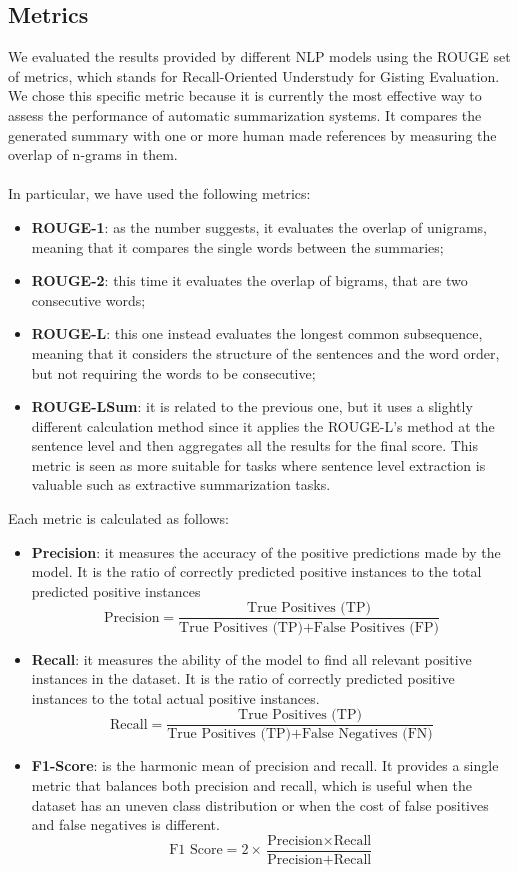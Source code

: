 \documentclass[10pt,twocolumn,letterpaper]{article}
\begin{document}
\subsection{Metrics}
We evaluated the results provided by different NLP models using the ROUGE set of metrics, which stands for Recall-Oriented Understudy for Gisting Evaluation. We chose this specific metric because it is currently the most effective way to assess the performance of automatic summarization systems. It compares the generated summary with one or more human made references by measuring the overlap of n-grams in them. \\ \\ 
In particular, we have used the following metrics:
\begin{itemize}
    \item \textbf{ROUGE-1}: as the number suggests, it evaluates the overlap of unigrams, meaning that it compares the single words between the summaries;
    \item \textbf{ROUGE-2}: this time it evaluates the overlap of bigrams, that are two consecutive words;
    \item \textbf{ROUGE-L}: this one instead evaluates the longest common subsequence, meaning that it considers the structure of the sentences and the word order, but not requiring the words to be consecutive;
    \item \textbf{ROUGE-LSum}: it is related to the previous one, but it uses a slightly different calculation method since it applies the ROUGE-L's method at the sentence level and then aggregates all the results for the final score. This metric is seen as more suitable for tasks where sentence level extraction is valuable such as extractive summarization tasks.
\end{itemize}
Each metric is calculated as follows:
\begin{itemize}
    \item \textbf{Precision}: it measures the accuracy of the positive predictions made by the model. It is the ratio of correctly predicted positive instances to the total predicted positive instances \\
    \[ \text{Precision} = \frac{\text{True Positives (TP)}}{\text{True Positives (TP)} + \text{False Positives (FP)}} \]
    \item \textbf{Recall}: it measures the ability of the model to find all relevant positive instances in the dataset. It is the ratio of correctly predicted positive instances to the total actual positive instances. \\
    \[ \text{Recall} = \frac{\text{True Positives (TP)}}{\text{True Positives (TP)} + \text{False Negatives (FN)}} \]
    \item \textbf{F1-Score}: is the harmonic mean of precision and recall. It provides a single metric that balances both precision and recall, which is useful when the dataset has an uneven class distribution or when the cost of false positives and false negatives is different. \\
    \[ \text{F1 Score} = 2 \times \frac{\text{Precision} \times \text{Recall}}{\text{Precision} + \text{Recall}} \]
\end{itemize}
\end{document}
